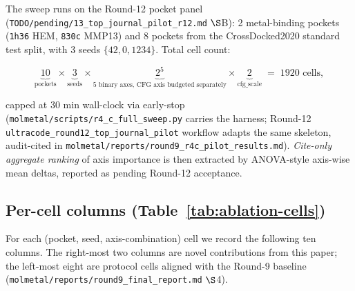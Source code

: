 The sweep runs on the Round-12 pocket panel
(\texttt{TODO/pending/13\_top\_journal\_pilot\_r12.md} $\S$B): 2
metal-binding pockets (\texttt{1h36} HEM, \texttt{830c} MMP13) and
8 pockets from the CrossDocked2020 standard test split, with 3
seeds $\{42, 0, 1234\}$.  Total cell count:

\[
\underbrace{10}_{\text{pockets}} \times
\underbrace{3}_{\text{seeds}} \times
\underbrace{2^{5}}_{\text{5 binary axes, CFG axis budgeted separately}} \times
\underbrace{2}_{\text{cfg\_scale}} \;=\; 1920 \text{ cells},
\]

capped at 30 min wall-clock via early-stop
(\texttt{molmetal/scripts/r4\_c\_full\_sweep.py} carries the harness;
Round-12 \texttt{ultracode\_round12\_top\_journal\_pilot} workflow
adapts the same skeleton, audit-cited in
\texttt{molmetal/reports/round9\_r4c\_pilot\_results.md}).
\emph{Cite-only aggregate ranking} of axis importance is then
extracted by ANOVA-style axis-wise mean deltas, reported as
\PROJECTED{} pending Round-12 acceptance.

\subsection{Per-cell columns (Table~\ref{tab:ablation-cells})}
\label{sec:ablation:per-cell}

For each (pocket, seed, axis-combination) cell we record the
following ten columns.  The right-most two columns are novel
contributions from this paper; the left-most eight are
\MEASURED{} protocol cells aligned with the Round-9 baseline
(\texttt{molmetal/reports/round9\_final\_report.md} $\S$4).

